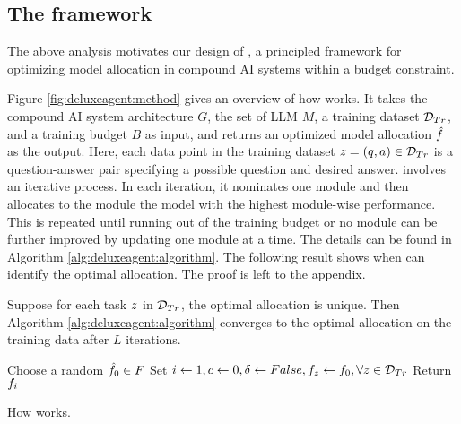 \subsection{The \deluxesystem{} framework}
The above analysis motivates our design of \deluxesystem{}, a principled framework for optimizing model allocation in compound AI systems within a budget constraint. 

Figure \ref{fig:deluxeagent:method} gives an overview of how  \deluxesystem{} works. It takes the compound AI system architecture $G$, the set of LLM $M$, a training dataset $\mathcal{D}_{Tr}$, and a training budget $B$ as input, and returns an optimized model allocation $\hat{f}$ as the output. Here, each data point in the training dataset $z = (q,a) \in \mathcal{D}_{Tr}$ is a question-answer pair specifying a possible question and desired answer. \deluxesystem{} involves an iterative process. In each iteration, it nominates one module and then allocates to the module the model with the highest module-wise performance. This is repeated until running out of the training budget or no module can be further improved by updating one module at a time. The details can be found in Algorithm \ref{alg:deluxeagent:algorithm}. The following result shows when \deluxesystem{} can identify the optimal allocation. The proof is left to the appendix. %

\begin{theorem}\label{thm:deluxeagent:convergence}
Suppose for each task $z$ in $\mathcal{D}_{Tr}$, the optimal allocation is unique. Then Algorithm \ref{alg:deluxeagent:algorithm} converges to the optimal allocation on the training data after $L$ iterations.   
\end{theorem}

\setlength{\algomargin}{2em} %
\begin{algorithm}[!ht]
\DontPrintSemicolon
{}

\SetAlgoLined
Choose a random $\hat{f}_0 \in F$ 
Set $i \gets 1, c\gets 0, \delta \gets False, f_{z} \gets f_0, \forall z \in \mathcal{D}_{Tr}$\;
Return $f_i$
\caption{How \deluxesystem{} works. }\label{alg:deluxeagent:algorithm}
\end{algorithm}


